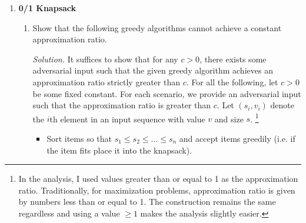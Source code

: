 \documentclass[11pt]{article}
\newcommand{\Exp}{\mathbb{E}}
\begin{document}
\begin{enumerate}[leftmargin=16pt]
\begin{enumerate}[leftmargin=16pt]
\begin{proof}
$${\begin{aligned}
                    &\leq (m-k-1) - \frac{m^k}{(m(m-k+1))^{k}}\int_{0}^{m-k+1} i^k di \\
                    &= (m-k-1) - \frac{m^k}{(m(m-k+1))^k} \frac{(m-k-1)^{k+1}}{k+1} \\
                    &= (m-k-1) - \frac{m-k+1}{k+1}
                \end{aligned}
            }
            $$
            In particular, the upper bounds on Line 6, 7, and 7 become negligible for sufficiently large $m$. From the expected load of the least loaded machien, we can calculate the expected makespan when the last large job is placed.
            $$
            \Exp[C_{ALG}] = m + (m-k-1) - \frac{m-k+1}{k+1} = 2m - k - \frac{m-k+1}{k+1} - 1
            $$
            which gives us the competitive ratio of
            $$
            \frac{\Exp[C_{ALG}]}{C_{OPT}} = \frac{2m - k - \frac{m-k+1}{k+1} - 1}{m} = 2 - \left( \frac{k+1}{m} + \frac{m-k+1}{mk+m} \right) 
            $$
            for which we have
            $$
            \frac{\Exp[C_{ALG}]}{C_{OPT}} \geq 2 - \epsilon
            $$
            for values of $m$ and $k$ satisfying $\frac{k+1}{m} + \frac{m-k+1}{mk+m} \leq \epsilon$.
        \end{proof}
    \end{enumerate}
    \item \textbf{0/1 Knapsack}
    \begin{enumerate}[leftmargin=16pt]
        \item Show that the following greedy algorithms cannot achieve a constant approximation ratio.
        
        \textit{Solution.} It suffices to show that for any $c > 0$, there exists some adversarial input such that the given greedy algorithm achieves an approximation ratio strictly greater than $c$. For all the following, let $c > 0$ be some fixed constant. For each scenario, we provide an adversarial input such that the approximation ratio is greater than $c$. Let $(s_i, v_i)$ denote the $i$th element in an input sequence with value $v$ and size $s$. \footnote{In the analysis, I used values greater than or equal to 1 as the approximation ratio. Traditionally, for maximization problems, approximation ratio is given by numbers less than or equal to 1. The construction remains the same regardless and using a value $\geq 1$ makes the analysis slightly easier.}

        \begin{itemize}[leftmargin=10pt]
            \item Sort items so that $s_1 \leq s_2 \leq \ldots \leq s_n$ and accept items greedily (i.e. if the item fits place it into the knapsack).
            

\end{itemize}
\end{enumerate}
\end{enumerate}
\end{document}
